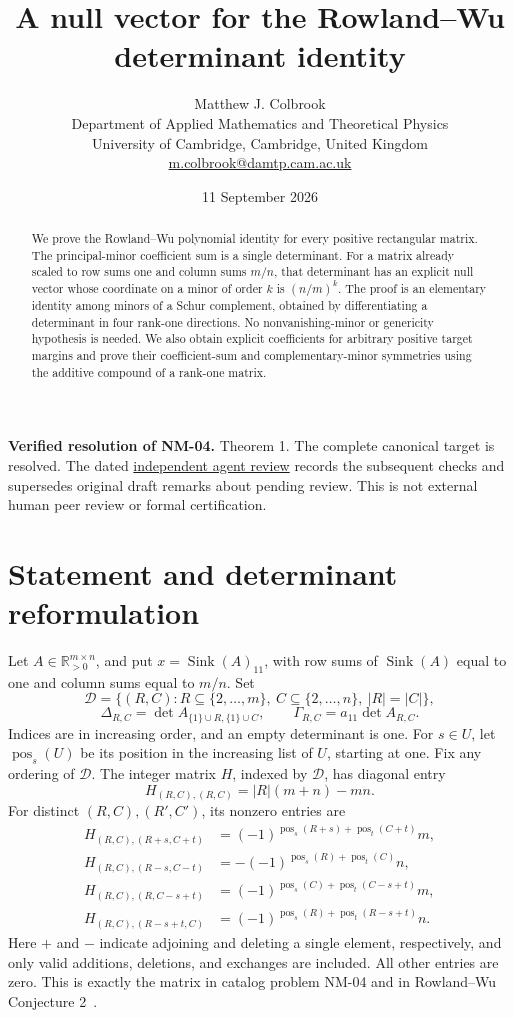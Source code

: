 \documentclass[11pt]{article}
\title{A null vector for the Rowland--Wu determinant identity}
\author{Matthew J. Colbrook\\\small Department of Applied Mathematics and Theoretical Physics\\\small University of Cambridge, Cambridge, United Kingdom\\\small\href{mailto:m.colbrook@damtp.cam.ac.uk}{m.colbrook@damtp.cam.ac.uk}}\date{11 September 2026}
\newcommand{\pos}{\operatorname{pos}}
\newcommand{\Sink}{\operatorname{Sink}}
\newcommand{\D}{\mathcal D}
\begin{document}
\maketitle

\noindent\textbf{Verified resolution of NM-04.} Theorem 1. The complete canonical target is resolved.
The dated \href{https://github.com/MColbrook/OpenProblemsInNLA/blob/codex/colbrook-factorization-resolutions/references/colbrook-factorization-2026-09-11/verification/reviews/NM-04-review.md}{independent agent review} records the subsequent checks and supersedes original draft remarks about pending review. This is not external human peer review or formal certification.
\par\medskip

\begin{abstract}
We prove the Rowland--Wu polynomial identity for every positive rectangular matrix. The principal-minor coefficient sum is a single determinant. For a matrix already scaled to row sums one and column sums $m/n$, that determinant has an explicit null vector whose coordinate on a minor of order $k$ is $(n/m)^k$. The proof is an elementary identity among minors of a Schur complement, obtained by differentiating a determinant in four rank-one directions. No nonvanishing-minor or genericity hypothesis is needed. We also obtain explicit coefficients for arbitrary positive target margins and prove their coefficient-sum and complementary-minor symmetries using the additive compound of a rank-one matrix.
\end{abstract}

\section{Statement and determinant reformulation}
Let $A\in\mathbb R_{>0}^{m\times n}$, and put $x=\Sink(A)_{11}$, with row sums of $\Sink(A)$ equal to one and column sums equal to $m/n$. Set
\[
 \D=\{(R,C):R\subseteq\{2,\ldots,m\},\ C\subseteq\{2,\ldots,n\},\ |R|=|C|\},
\]
\[
 \Delta_{R,C}=\det A_{\{1\}\cup R,\{1\}\cup C},\qquad
 \Gamma_{R,C}=a_{11}\det A_{R,C}.
\]
Indices are in increasing order, and an empty determinant is one. For $s\in U$, let $\pos_s(U)$ be its position in the increasing list of $U$, starting at one. Fix any ordering of $\D$. The integer matrix $H$, indexed by $\D$, has diagonal entry
\[
 H_{(R,C),(R,C)}=|R|(m+n)-mn.
\]
For distinct $(R,C),(R',C')$, its nonzero entries are
\begin{align*}
 H_{(R,C),(R+s,C+t)}&=(-1)^{\pos_s(R+s)+\pos_t(C+t)}m,\\
 H_{(R,C),(R-s,C-t)}&=-(-1)^{\pos_s(R)+\pos_t(C)}n,\\
 H_{(R,C),(R,C-s+t)}&=(-1)^{\pos_s(C)+\pos_t(C-s+t)}m,\\
 H_{(R,C),(R-s+t,C)}&=(-1)^{\pos_s(R)+\pos_t(R-s+t)}n.
\end{align*}
Here $+$ and $-$ indicate adjoining and deleting a single element, respectively, and only valid additions, deletions, and exchanges are included. All other entries are zero. This is exactly the matrix in catalog problem NM-04 and in Rowland--Wu Conjecture 2~\cite{rw,catalog}.
\end{document}
